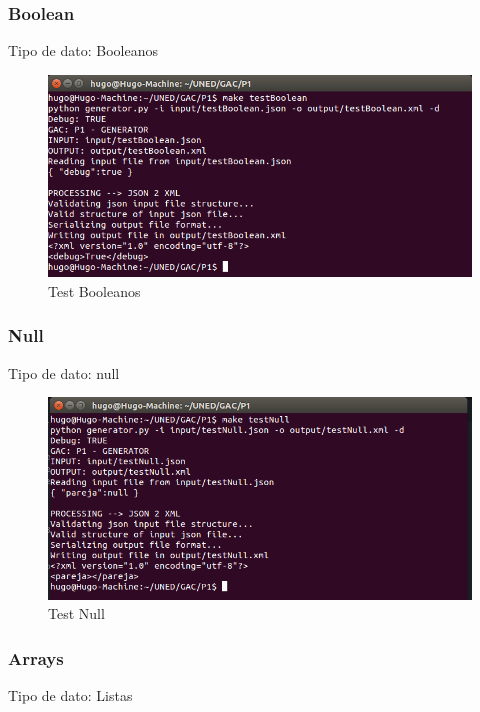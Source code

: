 \documentclass[a4paper,11pt]{book}
\begin{document}
\subsubsection{Boolean}
Tipo de dato: Booleanos

\begin{figure}[H]  
\centering 
\includegraphics[scale=0.35]{imagenes/testBoolean.png}
\caption{ Test Booleanos  }  
\end{figure} 

\subsubsection{Null}
Tipo de dato: null

\begin{figure}[H]  
\centering 
\includegraphics[scale=0.35]{imagenes/testNull.png}
\caption{ Test Null  }  
\end{figure} 

\subsubsection{Arrays}
Tipo de dato: Listas
\end{document}
